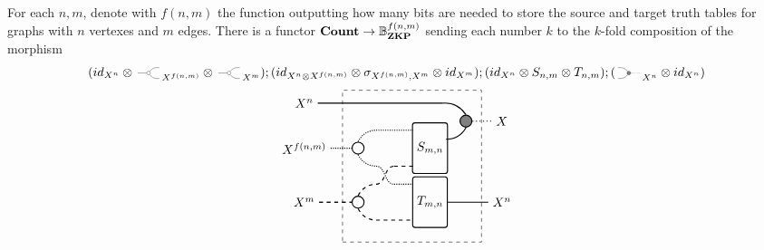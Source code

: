 \documentclass[submission,copyright,creativecommons,sharealike,noncommercial]{eptcs}
\begin{document}
\begin{theorem}
  For each $n,m$, denote with $f(n,m)$ the function outputting how many
  bits are needed to store the source and target truth tables for graphs 
  with $n$ vertexes and $m$ edges. There is a functor $\textbf{Count} \to \mathbb{B}^{f(n,m)}_\textbf{ZKP}$ sending each 
  number $k$ to the $k$-fold composition of the morphism
  \begin{equation*}
    (\Id{X^n} \Tensor \COPYSym_{X^{f(n,m)}} \Tensor \COPYSym_{X^m});
    (\Id{X^n \Tensor X^{f(n,m)}} \Tensor \sigma_{X^{f(n,m)},X^m} \Tensor \Id{X^m});
    (\Id{X^n} \Tensor S_{n,m} \Tensor T_{n,m});(\MATCHSym_{X^n} \Tensor \Id{X^n})
  \end{equation*}
  \begin{equation*}
    \begin{tikzpicture}
      \node[draw, circle, radius=5pt, thick] (copy2) at (-2,1.75) {};
      \node[draw, circle, radius=5pt, thick] (copy) at (-2,0.25) {};

      \node[draw, minimum height=40, minimum width=20, rounded corners=2, thick] (S) at (0,1.75) {$S_{m,n}$};
      \node[draw, minimum height=40, minimum width=20, rounded corners=2, thick] (T) at (0,0.25) {$T_{m,n}$};
      \node[draw, fill=gray, circle, radius=5pt, thick] (mat) at (1,2.5) {};

      \node[draw, dashed, minimum height=120, minimum width=110] (contour) at (-0.5,1.25) {};

      \node (Xv) at (-3.5,3) {$X^n$};
      \node (Xf) at (-3.5,1.75) {$X^{f(n,m)}$};
      \node (Xe) at (-3.5,0.25) {$X^m$};

      \node (X) at (2,2.5) {$X$};
      \node (Xv2) at (2,0.25) {$X^n$};

      \draw[-, thick] (Xv) to (10pt,3);
      \draw[-, densely dotted, thick] (Xf) to (copy2.west);
      \draw[-, dashed, thick] (Xe) to (copy.west);

      \draw[densely dotted, bend left, thick] (copy2.north) to (-1.5,2.25);
      \draw[densely dotted, bend right, thick] (copy2.south) to (-1.5, 1.25);
      \draw[dashed, bend left, thick] (copy.north) to (-1.5,0.75);
      \draw[dashed, bend right, thick] (copy.south) to (-1.5, -0.25);

      \draw[-, densely dotted, thick] (-1.5, 2.25) to (-0.47, 2.25);
      \draw[dashed, thick, out=0, in=180] (-1.5,0.75) to (-1, 1.25);
      \draw[densely dotted, thick, out=0, in=180] (-1.5,1.25) to (-1,0.75);
      \draw[-, dashed, thick] (-1.5, -0.25) to (-0.47,-0.25);

      \draw[-, dashed, thick] (-1, 1.25) to (-0.47, 1.25);
      \draw[-, densely dotted, thick] (-1, 0.75) to (-0.47,0.75);

      \draw[bend left, thick] (10pt,3) to (mat.north);
      \draw[bend right, thick] (0.45, 2) to (mat.south);

      \draw[dashed, -, thick] (Xe) to (copy.west);



      \draw[-, dotted, thick] (mat.east) -- (X);
      \draw[-, thick] (T.east) -- (Xv2.west);
    \end{tikzpicture}
  \end{equation*}
\end{theorem}
\end{document}
